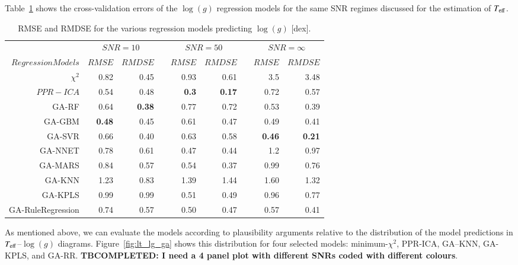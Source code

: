 Table~\ref{tab:models_G_rmse} shows the cross-validation errors of the
$\log(g)$ regression models for the same SNR regimes discussed for the
estimation of $T_{\rm eff}$. 

%
%
\begin{table}\centering
\begin{tabular}{@{}rrrcrrcrr@{}}\toprule
& \multicolumn{2}{c}{$SNR = 10$} & \phantom{ab}& \multicolumn{2}{c}{$SNR = 50$} &
\phantom{ab} & \multicolumn{2}{c}{$SNR = \infty$}\\
\cmidrule{2-3} \cmidrule{5-6} \cmidrule{8-9}
$Regression Models$ & $RMSE$ & $RMDSE$ && $RMSE$ & $RMDSE$     && $RMSE$       & $RMDSE$ \\ \midrule
$\chi^2$          & 0.82       & 0.45      && 0.93       & 0.61       && 3.5        & 3.48 \\
$ PPR-ICA$        & 0.54       & 0.48      && {\bf 0.3}  & {\bf 0.17} && 0.72       & 0.57 \\
GA-RF             & 0.64       & \bf{0.38} && 0.77       & 0.72       && 0.53       & 0.39 \\
GA-GBM            & {\bf 0.48} & 0.45      && 0.61       & 0.47       && 0.49       & 0.41 \\
GA-SVR            & 0.66       & 0.40      && 0.63       & 0.58       && {\bf 0.46} & \bf{0.21} \\
GA-NNET           & 0.78       & 0.61      && 0.47       & 0.44       && 1.2        & 0.97 \\
GA-MARS           & 0.84       & 0.57      && 0.54       & 0.37       && 0.99       & 0.76 \\
GA-KNN            & 1.23       & 0.83      && 1.39       & 1.44       && 1.60       & 1.32 \\
GA-KPLS           & 0.99       & 0.99      && 0.51       & 0.49       && 0.96       & 0.77 \\
GA-RuleRegression & 0.74       & 0.57      && 0.50       & 0.47       && 0.57       & 0.41 \\

\bottomrule
\end{tabular}
\caption {RMSE and RMDSE for the various regression models predicting $\log(g)$ [dex].} 
\label{tab:models_G_rmse} 
\end{table}

As mentioned above, we can evaluate the models according to
plausibility arguments relative to the distribution of the model
predictions in $T_{\rm eff}$--$\log(g)$
diagrams. Figure~\ref{fig:lt_lg_ga} shows this distribution for four
selected models: minimum-$\chi^2$, PPR-ICA, GA--KNN, GA-KPLS, and
GA-RR. {\bf TBCOMPLETED: I need a 4 panel plot with different SNRs
  coded with different colours}.

